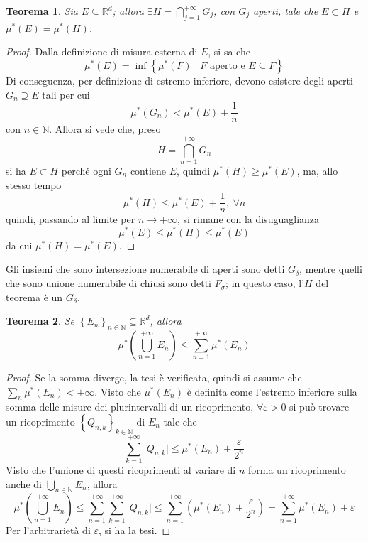 \documentclass[11pt]{article}
\theoremstyle{style}
\newtheorem{teorema}{Teorema}[section]
\numberwithin{equation}{subsection}
\begin{document}
\begin{teorema}
	Sia $E \subseteq \mathbb{R}^d$; allora $\exists H = \bigcap_{j=1} ^{+\infty} G_j$, con $G_j$ aperti, tale che $E \subset H$ e $\mu ^*(E) = \mu ^*(H)$.
\end{teorema}
	\begin{proof}
		Dalla definizione di misura esterna di $E$, si sa che
		\[
		\mu ^*(E) = \inf \left\{ \mu ^*(F)  \mid F \text{ aperto e } E \subseteq F \right\} 
		\] 
		Di conseguenza, per definizione di estremo inferiore, devono esistere degli aperti $G_n \supseteq E$ tali per cui
		\[
		\mu ^*(G_n) < \mu ^*(E) + \frac{1}{n}
		\] 
		con $n \in \mathbb{N}$.
		Allora si vede che, preso 
		\[
		H = \bigcap _{n=1} ^{+\infty} G_n 
	\]
	si ha $E \subset H$ perch\'e ogni $G_n$ contiene $E$, quindi $\mu ^*(H)\ge \mu ^*(E)$, ma, allo stesso tempo
	\[
	\mu ^*(H)\le \mu ^*(E) + \frac{1}{n}, \ \forall n
	\] 
	quindi, passando al limite per $n\to +\infty$, si rimane con la disuguaglianza
	\[
	\mu ^*(E) \le \mu^* (H) \le \mu ^*(E)
	\] 
	da cui $\mu^* (H) = \mu ^*(E)$.
\end{proof}
Gli insiemi che sono intersezione numerabile di aperti sono detti $G_\delta $, mentre quelli che sono unione numerabile di chiusi sono detti $F_\sigma $; in questo caso, l'$H$ del teorema \`e un $G_\delta $.
\begin{teorema}
	Se $\left\{ E_n \right\} _{n\in \mathbb{N}} \subseteq \mathbb{R}^d$, allora
	\[
	\mu ^*\left(\bigcup_{n=1}^{+\infty} E_n \right) \le \sum_{n=1}^{+\infty} \mu ^*(E_n)
	\] 
\end{teorema}
\begin{proof}
	Se la somma diverge, la tesi \`e verificata, quindi si assume che $\sum_{n}^{} \mu ^*(E_n)<+\infty$.
Visto che $\mu ^*(E_n)$ \`e definita come l'estremo inferiore sulla somma delle misure dei plurintervalli di un ricoprimento, $\forall \varepsilon >0$ si pu\`o trovare un ricoprimento $\left\{ Q_{n,k}  \right\} _{k\in \mathbb{N}} $ di $E_n$ tale che
\[
\sum_{k=1}^{+\infty} \lvert Q_{n,k}  \rvert \le \mu ^*(E_n) + \frac{\varepsilon }{2^n}
\] 
Visto che l'unione di questi ricoprimenti al variare di $n$ forma un ricoprimento anche di $\bigcup_{n\in \mathbb{N}} E_n$, allora
\[
\mu ^*\left(\bigcup_{n=1} ^{+\infty} E_n\right) \le \sum_{n=1}^{+\infty} \sum_{k=1}^{+\infty} \lvert Q_{n,k}  \rvert \le \sum_{n=1}^{+\infty}\left( \mu ^*(E_n) + \frac{\varepsilon }{2^n}\right) = \sum_{n=1}^{+\infty} \mu ^*(E_n) + \varepsilon 
\] 
Per l'arbitrariet\`a di $\varepsilon $, si ha la tesi.
\end{proof}
\end{document}

